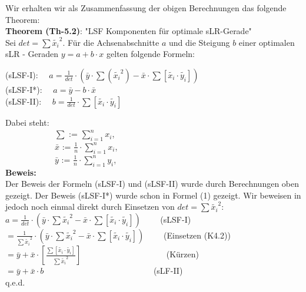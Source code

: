 \documentclass[12pt]{article}
\begin{document}
%
Wir erhalten wir als Zusammenfassung der obigen Berechnungen das folgende Theorem: \\[0.6cm]
%
\textbf{Theorem (Th-5.2)}: "LSF Komponenten für optimale sLR-Gerade" \\[0.2cm]
Sei $ det = \sum{\widetilde{x_i}}^2 $. Für die Achsenabschnitte $a$ und die Steigung $b$ einer optimalen sLR - Geraden $ y = a +  b \cdot x $ gelten folgende Formeln:\\[0.5cm]
\begin{large}
(sLSF-I): $ \quad a = \frac{1}{det} \cdot (\bar{y} \cdot \sum{(\widetilde{x_i}^2)} - \bar{x} \cdot  \sum{[\widetilde{x_i} \cdot \widetilde{y_i}]}) \quad\quad $   \\[0.3cm] 
(sLSF-I*): $ \quad a = \bar{y} - b \cdot \bar{x} \qquad \qquad \qquad \qquad\qquad \qquad $ \\[0.3cm]                                   
(sLSF-II): $ \quad b = \frac{1}{det} \cdot {\sum[\widetilde{x_i} \cdot \widetilde{y_i}]} \qquad \qquad \qquad \qquad $  \\[0.5cm]
\end{large}
Dabei steht:\\
$ \quad\quad\quad\quad\quad\quad \sum $  := $ \sum\limits_{i=1}^n x_i $,\\
$ \quad\quad\quad\quad\quad\quad \bar{x} $  := $ \frac{1}{n} \cdot {\sum\limits_{i=1}^n x_i} $, \\
$ \quad\quad\quad\quad\quad\quad \bar{y} $  := $ \frac{1}{n} \cdot {\sum\limits_{i=1}^n y_i} $, \\
\textbf{Beweis:}\\[0.2cm]
%
Der Beweis der Formeln (sLSF-I) und (sLSF-II) wurde durch Berechnungen oben gezeigt. Der Beweis (sLSF-I*) wurde schon in Formel (1) gezeigt. Wir beweisen in jedoch noch einmal direkt durch Einsetzen von $ det = \sum{\widetilde{x_i}}^2 $:\\[0.2cm]
$ a = \frac{1}{det} \cdot (\bar{y} \cdot \sum{\widetilde{x_i}^2} - \bar{x} \cdot  \sum{[\widetilde{x_i} \cdot \widetilde{y_i}]})\qquad $                (sLSF-I) \\[0.2cm] 
$  = \frac{1}{\sum{\widetilde{x_i}}^2} \cdot (\bar{y} \cdot \sum{{\widetilde{x_i}}^2} - \bar{x} \cdot  \sum{[\widetilde{x_i} \cdot \widetilde{y_i}]})\qquad $ (Einsetzen (K4.2))\\[0.2cm]
$ = \bar{y} + \bar{x} \cdot [\frac{\sum{[\widetilde{x_i} \cdot \widetilde{y_i}]}}{\sum{\widetilde{x_i}}^2}] \qquad \qquad \qquad \qquad \qquad $ (Kürzen)\\[0.3cm]
$ = \bar{y} + \bar{x} \cdot b \qquad \qquad\qquad \qquad \qquad \qquad \quad $ (sLF-II)\\    q.e.d.
\end{document}
